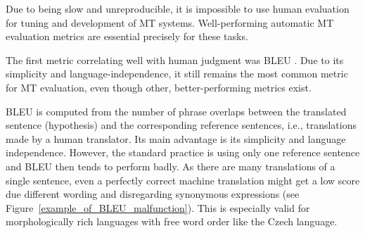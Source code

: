 \documentclass[11pt]{article}
\def\Fref#1{Figure~\ref{#1}}
\begin{document}
Due to being slow and unreproducible, it is impossible to use human evaluation
for tuning and development of MT systems. Well-performing automatic MT evaluation
metrics are essential precisely for these tasks.

The first metric correlating well with human judgment was BLEU \cite{bleu}.
Due to its simplicity and language-independence, it still remains the most common 
metric for MT evaluation, even though other, better-performing metrics exist. 
\cite{wmt13-metrics} %

BLEU is computed from the number of phrase overlaps between the translated
sentence (hypothesis) and the corresponding reference sentences, i.e., translations
made by a human translator. Its main advantage is its simplicity and language independence. 
However, the standard practice is using only one reference sentence and BLEU then tends 
to perform badly. As there are many translations of 
a single sentence, even a perfectly correct machine translation might get a low score 
due different wording and disregarding synonymous expressions (see \Fref{example_of_BLEU_malfunction}). 
This is especially valid for morphologically rich languages with free word order like 
the Czech language. \cite{bojar-tackling-sparse-data}
\end{document}
